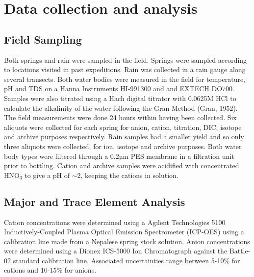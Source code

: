 
\section{Data collection and analysis}



\subsection{Field Sampling}
Both springs and rain were sampled in the field. Springs were sampled according to locations visited in past expeditions. Rain was collected in a rain gauge along several transects. Both water bodies were measured in the field for temperature, pH and TDS on a Hanna Instruments HI-991300 and and EXTECH DO700. Samples were also titrated using a Hach digital titrator with 0.0625M HCl to calculate the alkalinity of the water following the Gran Method (Gran, 1952). The field measurements were done 24 hours within having been collected.  Six aliquots were collected for each spring for anion, cation, titration, DIC, isotope and archive purposes respectively.  Rain samples had a smaller yield and so only three aliquots were collected, for ion, isotope and archive purposes. Both water body types were filtered through a 0.2µm PES membrane in a filtration unit prior to bottling. Cation and archive samples were acidified with concentrated HNO$_3$ to give a pH of $\sim$2, keeping the cations in solution. 






\subsection{Major and Trace Element Analysis}

Cation concentrations were determined using a Agilent Technologies 5100 Inductively-Coupled Plasma Optical Emission Spectrometer (ICP-OES) using a calibration line made from a Nepalese spring stock solution.
Anion concentrations were determined using a Dionex ICS-5000 Ion Chromatograph against the Battle-02 standard calibration line. Associated 
uncertainties range between 5-10\% for cations and 10-15\% for anions.


